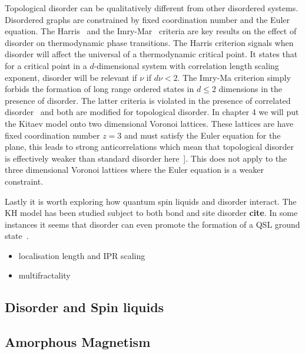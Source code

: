 Topological disorder can be qualitatively different from other disordered systems. Disordered graphs are constrained by fixed coordination number and the Euler equation. The Harris~\autocite{harrisEffectRandomDefects1974} and the Imry-Mar~\autocite{imryRandomFieldInstabilityOrdered1975} criteria are key results on the effect of disorder on thermodynamic phase transitions. The Harris criterion signals when disorder will affect the universal of a thermodynamic critical point. It states that for a critical point in a \(d\)-dimensional system with correlation length scaling exponent, disorder will be relevant if \(\nu\) if \(d\nu < 2\). The Imry-Ma criterion simply forbids the formation of long range ordered states in \(d \leq 2\) dimensions in the presence of disorder. The latter criteria is violated in the presence of correlated disorder~\autocite{changlaniChargeDensityWaves2016} and both are modified for topological disorder. In chapter 4 we will put the Kitaev model onto two dimensional Voronoi lattices. These lattices are have fixed coordination number \(z=3\) and must satisfy the Euler equation for the plane, this leads to strong anticorrelations which mean that topological disorder is effectively weaker than standard disorder here~\autocite{barghathiPhaseTransitionsRandom2014,schrauthViolationHarrisBarghathiVojtaCriterion2018}{]}. This does not apply to the three dimensional Voronoi lattices where the Euler equation is a weaker constraint.

Lastly it is worth exploring how quantum spin liquids and disorder interact. The KH model has been studied subject to both bond and site disorder \textbf{cite}. In some instances it seems that disorder can even promote the formation of a QSL ground state~\autocite{wenDisorderedRouteCoulomb2017}.

\begin{itemize}
\tightlist
\item
  localisation length and IPR scaling
\item
  multifractality
\end{itemize}

\hypertarget{disorder-and-spin-liquids}{%
\subsection{Disorder and Spin liquids}\label{disorder-and-spin-liquids}}

\hypertarget{amorphous-magnetism}{%
\subsection{Amorphous Magnetism}\label{amorphous-magnetism}}
